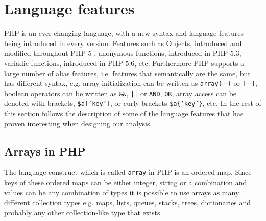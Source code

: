 \section{Language features}
PHP is an ever-changing language, with a new syntax and language features being introduced in every version. Features such as Objects, introduced and modified throughout PHP 5 , anonymous functions, introduced in PHP 5.3, variadic functions, introduced in PHP 5.6, etc. Furthermore PHP supports a large number of alias features, i.e. features that semantically are the same, but has different syntax, e.g. array initialization can be written as \texttt{array($\cdots$)} or \texttt{[$\cdots$]}, boolean operators can be written as \texttt{\&\&}, \texttt{||} or \texttt{AND}, \texttt{OR}, array access can be denoted with brackets, \texttt{\$a['key']}, or curly-brackets \texttt{\$a\{'key'\}}, etc. In the rest of this section follows the description of some of the language features that has proven interesting when designing our analysis.

\subsection{Arrays in PHP}
The language construct which is called \texttt{array} in PHP is an ordered map. Since keys of these ordered maps can be either integer, string or a combination and values can be any combination of types it is possible to use arrays as many different collection types e.g. maps, lists, queues, stacks, trees, dictionaries and probably any other collection-like type that exists.

